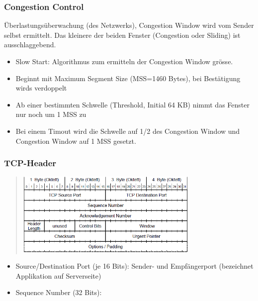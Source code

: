 \subsubsection*{Congestion Control}

Überlastungsüberwachung (des Netzwerks), Congestion Window wird vom
Sender selbst ermittelt. Das kleinere der beiden Fenster (Congestion
oder Sliding) ist ausschlaggebend.
\begin{itemize}
\item Slow Start: Algorithmus zum ermitteln der Congestion Window grösse.
\item Beginnt mit Maximum Segment Size (MSS=1460 Bytes), bei Bestätigung
wirds verdoppelt
\item Ab einer bestimmten Schwelle (Threshold, Initial 64 KB) nimmt das
Fenster nur noch um 1 MSS zu
\item Bei einem Timout wird die Schwelle auf 1/2 des Congestion Window und
Congestion Window auf 1 MSS gesetzt.
\end{itemize}

\subsubsection*{TCP-Header}
\begin{verse}
\includegraphics[height=4cm]{part3/TCP_Header}\end{verse}
\begin{itemize}
\item Source/Destination Port (je 16 Bits): Sender- und Empfängerport (bezeichnet
Applikation auf Serverseite)
\item Sequence Number (32 Bits): \end{itemize}


